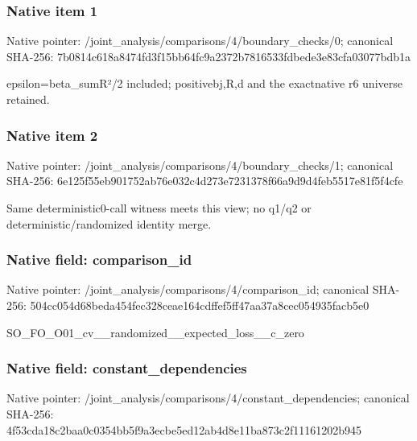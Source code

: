 \documentclass[10pt,a4paper]{article}
\begin{document}
\subsubsection{Native item 1}
Native pointer: /joint\_\allowbreak{}analysis/comparisons/4/boundary\_\allowbreak{}checks/0; canonical SHA-256: 7b0814c618a8474fd3f15bb64fc9a2372b7816533fdbede3e83cfa03077bdb1a

\begingroup\raggedright\sloppy epsilon=\allowbreak{}beta\_\allowbreak{}sumR{\AtlasUnicodeText ²}\allowbreak{}/\allowbreak{}2 included;\allowbreak{} positivebj,\allowbreak{}R,\allowbreak{}d and the exactnative r6 universe retained.\par\endgroup

\subsubsection{Native item 2}
Native pointer: /joint\_\allowbreak{}analysis/comparisons/4/boundary\_\allowbreak{}checks/1; canonical SHA-256: 6e125f55eb901752ab76e032c4d273e7231378f66a9d9d4feb5517e81f5f4cfe

\begingroup\raggedright\sloppy Same deterministic0-call witness meets this view;\allowbreak{} no q1/\allowbreak{}q2 or deterministic/\allowbreak{}randomized identity merge.\par\endgroup

\subsubsection{Native field: comparison\_\allowbreak{}id}
Native pointer: /joint\_\allowbreak{}analysis/comparisons/4/comparison\_\allowbreak{}id; canonical SHA-256: 504cc054d68beda454fec328ceae164cdffef5ff47aa37a8cec054935facb5e0

\begingroup\raggedright\sloppy SO\_\allowbreak{}FO\_\allowbreak{}O01\_\allowbreak{}cv\_\allowbreak{}\_\allowbreak{}randomized\_\allowbreak{}\_\allowbreak{}expected\_\allowbreak{}loss\_\allowbreak{}\_\allowbreak{}c\_\allowbreak{}zero\par\endgroup

\subsubsection{Native field: constant\_\allowbreak{}dependencies}
Native pointer: /joint\_\allowbreak{}analysis/comparisons/4/constant\_\allowbreak{}dependencies; canonical SHA-256: 4f53cda18c2baa0c0354bb5f9a3ecbe5ed12ab4d8e11ba873c2f11161202b945
\end{document}

